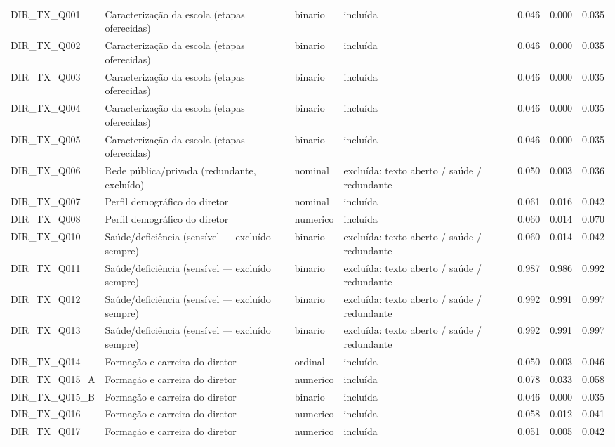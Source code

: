 \begin{tabular}{llllrrr}
DIR\_TX\_Q001 & Caracterização da escola (etapas oferecidas) & binario & incluída & 0.046 & 0.000 & 0.035 \\
DIR\_TX\_Q002 & Caracterização da escola (etapas oferecidas) & binario & incluída & 0.046 & 0.000 & 0.035 \\
DIR\_TX\_Q003 & Caracterização da escola (etapas oferecidas) & binario & incluída & 0.046 & 0.000 & 0.035 \\
DIR\_TX\_Q004 & Caracterização da escola (etapas oferecidas) & binario & incluída & 0.046 & 0.000 & 0.035 \\
DIR\_TX\_Q005 & Caracterização da escola (etapas oferecidas) & binario & incluída & 0.046 & 0.000 & 0.035 \\
DIR\_TX\_Q006 & Rede pública/privada (redundante, excluído) & nominal & excluída: texto aberto / saúde / redundante & 0.050 & 0.003 & 0.036 \\
DIR\_TX\_Q007 & Perfil demográfico do diretor & nominal & incluída & 0.061 & 0.016 & 0.042 \\
DIR\_TX\_Q008 & Perfil demográfico do diretor & numerico & incluída & 0.060 & 0.014 & 0.070 \\
DIR\_TX\_Q010 & Saúde/deficiência (sensível — excluído sempre) & binario & excluída: texto aberto / saúde / redundante & 0.060 & 0.014 & 0.042 \\
DIR\_TX\_Q011 & Saúde/deficiência (sensível — excluído sempre) & binario & excluída: texto aberto / saúde / redundante & 0.987 & 0.986 & 0.992 \\
DIR\_TX\_Q012 & Saúde/deficiência (sensível — excluído sempre) & binario & excluída: texto aberto / saúde / redundante & 0.992 & 0.991 & 0.997 \\
DIR\_TX\_Q013 & Saúde/deficiência (sensível — excluído sempre) & binario & excluída: texto aberto / saúde / redundante & 0.992 & 0.991 & 0.997 \\
DIR\_TX\_Q014 & Formação e carreira do diretor & ordinal & incluída & 0.050 & 0.003 & 0.046 \\
DIR\_TX\_Q015\_A & Formação e carreira do diretor & numerico & incluída & 0.078 & 0.033 & 0.058 \\
DIR\_TX\_Q015\_B & Formação e carreira do diretor & binario & incluída & 0.046 & 0.000 & 0.035 \\
DIR\_TX\_Q016 & Formação e carreira do diretor & numerico & incluída & 0.058 & 0.012 & 0.041 \\
DIR\_TX\_Q017 & Formação e carreira do diretor & numerico & incluída & 0.051 & 0.005 & 0.042 \\

\end{tabular}

